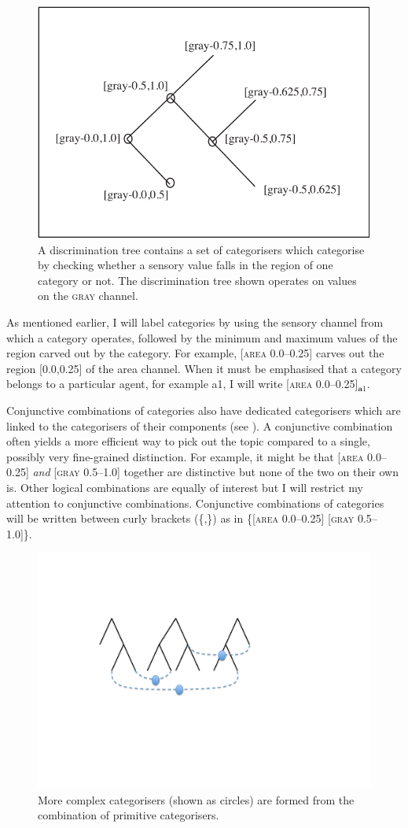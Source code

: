 \begin{figure}[htbp]
  \centerline{\includegraphics[width=.65\textwidth]{chap4/figs/tree.pdf}}
\caption{\label{trees}A discrimination tree contains
a set of categorisers which categorise by checking whether
a sensory value falls in the region of one category or 
not. The discrimination tree shown operates on
values on the \textsc{gray} channel.}
\end{figure}

As mentioned earlier, I will label categories
by using the sensory channel from which a category operates, 
followed by the minimum and maximum values of the region
carved out by the category. For example, 
[\textsc{area} 0.0–0.25] carves out the region [0.0,0.25] of the 
area channel. When it must be emphasised that 
a category belongs to a particular agent, for 
example {\bfshape a1}, I will write [\textsc{area} 0.0–0.25]$_{\mathbf a1}$. 

Conjunctive combinations of categories also have
dedicated categorisers which are linked to 
the categorisers of their components (see 
). A conjunctive combination 
often yields a more efficient way to pick out 
the topic compared to a single, possibly very fine-grained
distinction. For example, it might be that 
[\textsc{area} 0.0–0.25] {\itshape and} [\textsc{gray} 0.5–1.0]
together are distinctive but none of the two on their
own is. Other logical combinations are equally of interest
but I will restrict my attention to conjunctive 
combinations. Conjunctive combinations of categories 
will be written between curly brackets (\{,\}) as in 
\{[\textsc{area} 0.0–0.25] [\textsc{gray} 0.5–1.0]\}. 

\begin{figure}[htbp]
  \centerline{\includegraphics[width=.65\textwidth]{chap4/figs/disnet.pdf}}
\caption{\label{disnet}More complex categorisers
(shown as circles) are formed from the combination
of primitive categorisers.}
\end{figure}


